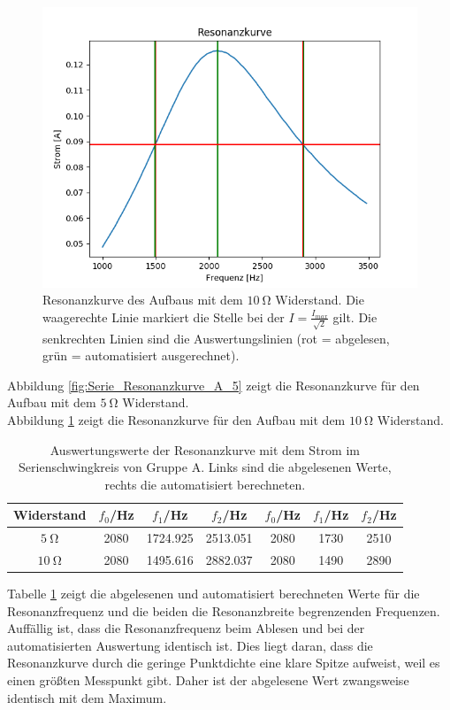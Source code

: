 \documentclass[12pt,a4paper]{article}
\begin{document}
\begin{figure}
\centering
\includegraphics[scale=0.8]{Bilder/Serie_Resonanzkurve_A_10.png}
\caption{Resonanzkurve des Aufbaus mit dem $\SI{10}{\ohm}$ Widerstand. Die waagerechte Linie markiert die Stelle bei der $I = \frac{I_{max}}{\sqrt{2}}$ gilt. Die senkrechten Linien sind die Auswertungslinien (rot = abgelesen, grün = automatisiert ausgerechnet).}
\label{fig:Serie_Resonanzkurve_A_10}
\end{figure}
Abbildung \ref{fig:Serie_Resonanzkurve_A_5} zeigt die Resonanzkurve für den Aufbau mit dem $\SI{5}{\ohm}$ Widerstand. \\
Abbildung \ref{fig:Serie_Resonanzkurve_A_10} zeigt die Resonanzkurve für den Aufbau mit dem $\SI{10}{\ohm}$ Widerstand.

\begin{table}
\centering
\begin{tabular}{|c|c|c|c||c|c|c|}
\hline
Widerstand & $f_0$/Hz & $f_1$/Hz & $f_2$/Hz & $f_0$/Hz & $f_1$/Hz & $f_2$/Hz \\
\hline
$\SI{5}{\ohm}$ & 2080 & 1724.925 & 2513.051 & 2080 & 1730 & 2510 \\
\hline
$\SI{10}{\ohm}$ & 2080 & 1495.616 & 2882.037 & 2080 & 1490 & 2890 \\
\hline
\end{tabular}
\caption{Auswertungswerte der Resonanzkurve mit dem Strom im Serienschwingkreis von Gruppe A. Links sind die abgelesenen Werte, rechts die automatisiert berechneten.}
\label{tab:StromResonanz_A}
\end{table}

Tabelle \ref{tab:StromResonanz_A} zeigt die abgelesenen und automatisiert berechneten Werte für die Resonanzfrequenz und die beiden die Resonanzbreite begrenzenden Frequenzen. Auffällig ist, dass die Resonanzfrequenz beim Ablesen und bei der automatisierten Auswertung identisch ist. Dies liegt daran, dass die Resonanzkurve durch die geringe Punktdichte eine klare Spitze aufweist, weil es einen größten Messpunkt gibt. Daher ist der abgelesene Wert zwangsweise identisch mit dem Maximum.
\end{document}
